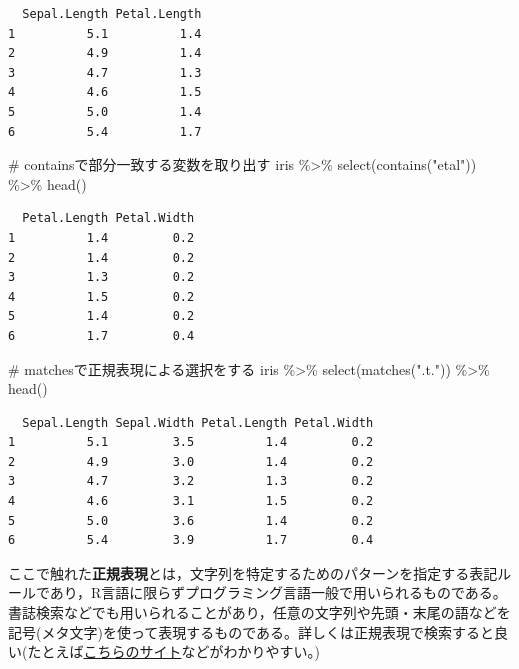 \documentclass[
  a4paper,
]{ltjsbook}
\newenvironment{Shaded}{\begin{snugshade}}{\end{snugshade}}
\newcommand{\CommentTok}[1]{\textcolor[rgb]{0.37,0.37,0.37}{#1}}
\newcommand{\FunctionTok}[1]{\textcolor[rgb]{0.28,0.35,0.67}{#1}}
\newcommand{\NormalTok}[1]{\textcolor[rgb]{0.00,0.23,0.31}{#1}}
\newcommand{\SpecialCharTok}[1]{\textcolor[rgb]{0.37,0.37,0.37}{#1}}
\newcommand{\StringTok}[1]{\textcolor[rgb]{0.13,0.47,0.30}{#1}}
\begin{document}
\begin{verbatim}
  Sepal.Length Petal.Length
1          5.1          1.4
2          4.9          1.4
3          4.7          1.3
4          4.6          1.5
5          5.0          1.4
6          5.4          1.7
\end{verbatim}

\begin{Shaded}
\begin{Highlighting}[]
\CommentTok{\# containsで部分一致する変数を取り出す}
\NormalTok{iris }\SpecialCharTok{\%\textgreater{}\%}
  \FunctionTok{select}\NormalTok{(}\FunctionTok{contains}\NormalTok{(}\StringTok{"etal"}\NormalTok{)) }\SpecialCharTok{\%\textgreater{}\%}
  \FunctionTok{head}\NormalTok{()}
\end{Highlighting}
\end{Shaded}

\begin{verbatim}
  Petal.Length Petal.Width
1          1.4         0.2
2          1.4         0.2
3          1.3         0.2
4          1.5         0.2
5          1.4         0.2
6          1.7         0.4
\end{verbatim}

\begin{Shaded}
\begin{Highlighting}[]
\CommentTok{\# matchesで正規表現による選択をする}
\NormalTok{iris }\SpecialCharTok{\%\textgreater{}\%}
  \FunctionTok{select}\NormalTok{(}\FunctionTok{matches}\NormalTok{(}\StringTok{".t."}\NormalTok{)) }\SpecialCharTok{\%\textgreater{}\%}
  \FunctionTok{head}\NormalTok{()}
\end{Highlighting}
\end{Shaded}

\begin{verbatim}
  Sepal.Length Sepal.Width Petal.Length Petal.Width
1          5.1         3.5          1.4         0.2
2          4.9         3.0          1.4         0.2
3          4.7         3.2          1.3         0.2
4          4.6         3.1          1.5         0.2
5          5.0         3.6          1.4         0.2
6          5.4         3.9          1.7         0.4
\end{verbatim}

ここで触れた\textbf{正規表現}とは，文字列を特定するためのパターンを指定する表記ルールであり，R言語に限らずプログラミング言語一般で用いられるものである。書誌検索などでも用いられることがあり，任意の文字列や先頭・末尾の語などを記号(メタ文字)を使って表現するものである。詳しくは正規表現で検索すると良い(たとえば\href{https://userweb.mnet.ne.jp/nakama/}{こちらのサイト}などがわかりやすい。)
\end{document}
